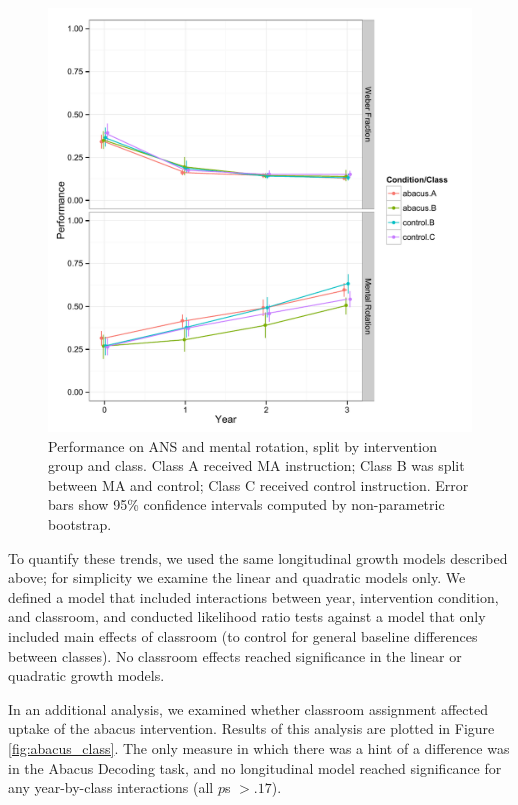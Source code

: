 \documentclass[11pt]{article}
\begin{document}
\begin{figure}[H]
\begin{center}
\includegraphics[width=5.5in]{figures/cog2_class.pdf}
\end{center}
\caption{Performance on ANS and mental rotation, split by intervention group and class. Class A received MA instruction; Class B was split between MA and control; Class C received control instruction. Error bars show 95\% confidence intervals computed by non-parametric bootstrap.}
\label{fig:cogclass2}
\end{figure}

To quantify these trends, we used the same longitudinal growth models described above; for simplicity we examine the linear and quadratic models only. We defined a model that included interactions between year, intervention condition, and classroom, and conducted likelihood ratio tests against a model that only included main effects of classroom (to control for general baseline differences between classes). No classroom effects reached significance in the linear or quadratic growth models. 

In an additional analysis, we examined whether classroom assignment affected uptake of the abacus intervention. Results of this analysis are plotted in Figure \ref{fig:abacus_class}. The only measure in which there was a hint of a difference was in the Abacus Decoding task, and no longitudinal model reached significance for any year-by-class interactions (all $p$s $> .17$). 
\end{document}
